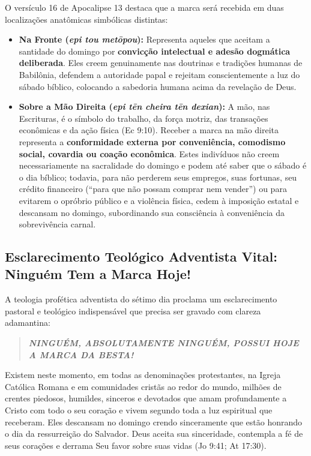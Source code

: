 \documentclass[11pt,a4paper,openany]{book}
\begin{document}
O versículo 16 de Apocalipse 13 destaca que a marca será recebida em duas localizações anatômicas simbólicas distintas:
\begin{itemize}
  \item \textbf{Na Fronte (\textit{epi tou metōpou}):} Representa aqueles que aceitam a santidade do domingo por \textbf{convicção intelectual e adesão dogmática deliberada}. Eles creem genuinamente nas doutrinas e tradições humanas de Babilônia, defendem a autoridade papal e rejeitam conscientemente a luz do sábado bíblico, colocando a sabedoria humana acima da revelação de Deus.
  \item \textbf{Sobre a Mão Direita (\textit{epi tēn cheira tēn dexian}):} A mão, nas Escrituras, é o símbolo do trabalho, da força motriz, das transações econômicas e da ação física (Ec 9:10). Receber a marca na mão direita representa a \textbf{conformidade externa por conveniência, comodismo social, covardia ou coação econômica}. Estes indivíduos não creem necessariamente na sacralidade do domingo e podem até saber que o sábado é o dia bíblico; todavia, para não perderem seus empregos, suas fortunas, seu crédito financeiro (``para que não possam comprar nem vender'') ou para evitarem o opróbrio público e a violência física, cedem à imposição estatal e descansam no domingo, subordinando sua consciência à conveniência da sobrevivência carnal.
\end{itemize}




\subsection{Esclarecimento Teológico Adventista Vital: Ninguém Tem a Marca Hoje!}


A teologia profética adventista do sétimo dia proclama um esclarecimento pastoral e teológico indispensável que precisa ser gravado com clareza adamantina:


\begin{quote}
\itshape \textbf{NINGUÉM, ABSOLUTAMENTE NINGUÉM, POSSUI HOJE A MARCA DA BESTA!}
\end{quote}


Existem neste momento, em todas as denominações protestantes, na Igreja Católica Romana e em comunidades cristãs ao redor do mundo, milhões de crentes piedosos, humildes, sinceros e devotados que amam profundamente a Cristo com todo o seu coração e vivem segundo toda a luz espiritual que receberam. Eles descansam no domingo crendo sinceramente que estão honrando o dia da ressurreição do Salvador. Deus aceita sua sinceridade, contempla a fé de seus corações e derrama Seu favor sobre suas vidas (Jo 9:41; At 17:30).
\end{document}
